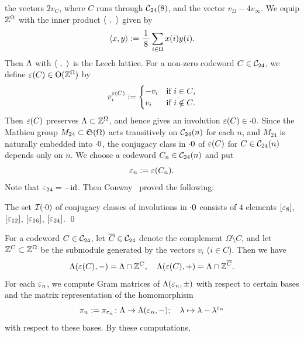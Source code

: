 \documentclass{amsart} %
\begin{document}
the vectors $2v_C$,
where $C$ runs through $\mathord{\mathcal{C}}_{24}(8)$, and 
the vector $v_{\Omega}-4v_{\infty}$.
%
%
We equip $\mathord{\mathbb{Z}}^{\Omega}$ with the inner product $\langle \phantom{i}, \phantom{i} \rangle$ 
given by
\[
\langle x, y \rangle:=\frac{1}{\,8\,} \sum_{i\in\Omega} x(i) y(i).
\]
Then $\Lambda$ with $\langle \phantom{i}, \phantom{i} \rangle$ is the Leech lattice.
For a non-zero codeword $C\in \mathord{\mathcal{C}}_{24}$,
we define $\varepsilon(C)\in \mathord{\mathrm{O}}(\mathord{\mathbb{Z}}^{\Omega})$ by 
\[
v_i^{\varepsilon(C)}:=
\begin{cases}
-v_i & \textrm{if $i\in C$}, \\
v_i& \textrm{if $i\notin C$}.
\end{cases}
\]
Then $\varepsilon(C)$ 
preserves %
$\Lambda\subset \mathord{\mathbb{Z}}^{\Omega}$, and hence gives 
an involution $\varepsilon(C)\in \cdot 0$. 
Since the Mathieu group $M_{24}\subset \mathord{\mathfrak{S}}(\Omega)$ acts transitively
on $\mathord{\mathcal{C}}_{24}(n)$ for each $n$, 
and $M_{24}$ is naturally embedded into $\cdot 0$,
the conjugacy class in $\cdot 0$ of $\varepsilon(C)$ for $C\in \mathord{\mathcal{C}}_{24}(n)$ 
depends only on $n$.
We choose a codeword $C_n\in \mathord{\mathcal{C}}_{24}(n)$ and put
\[
\varepsilon_n:=\varepsilon(C_n).
\]
Note that $\varepsilon_{24}=-\mathord{\mathrm{id}}$.
Then Conway~\cite[Chapter 10, Section 3.7]{theCSbook} proved the following:
%
\begin{theorem}[Conway]
The set $\mathord{\mathcal{I}}(\cdot 0)$ of conjugacy classes of involutions in $\cdot 0$ 
consists of $4$ elements $[\varepsilon_8]$, $[\varepsilon_{12}]$, $[\varepsilon_{16}]$, $[\varepsilon_{24}]$.
\qed
\end{theorem}
%
%
%
For a codeword $C\in \mathord{\mathcal{C}}_{24}$,
let $\overline{C}\in \mathord{\mathcal{C}}_{24}$ denote the complement $\Omega\setminus C$,
and let 
$\mathord{\mathbb{Z}}^{C}\subset \mathord{\mathbb{Z}}^{\Omega}$ be 
the submodule generated by the vectors $v_i$ ($i\in C$).
Then we have
%
\begin{equation}\label{eq:Leechveppm}
\Lambda(\varepsilon(C), -)=\Lambda\cap \mathord{\mathbb{Z}}^{C},
\quad
\Lambda(\varepsilon(C), +)=\Lambda\cap \mathord{\mathbb{Z}}^{\overline{C}}.
\end{equation}
%
For each $\varepsilon_n$,
we compute Gram matrices of $\Lambda(\varepsilon_n, \pm)$ 
with respect to certain bases
and the matrix representation of the homomorphism 
\[
\pi_n:=\pi_{\varepsilon_n}\colon \Lambda \to \Lambda(\varepsilon_n, -); \quad \lambda\mapsto \lambda-\lambda^{\varepsilon_n}
\]
with respect to these bases.
By these computations,
\end{document}
